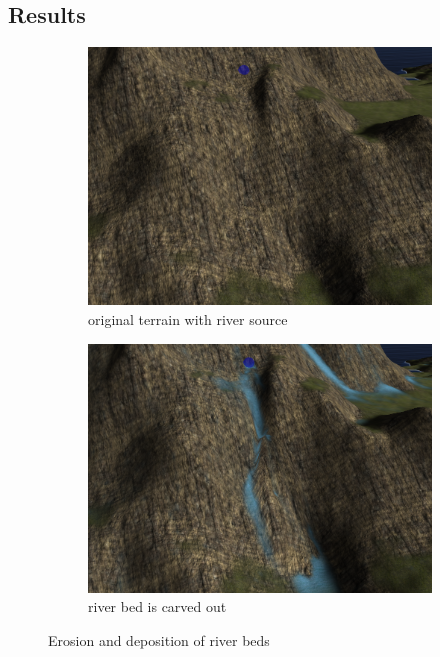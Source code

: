 \documentclass[journal, letterpaper]{IEEEtran}
\begin{document}
\subsection{Results}
\begin{figure}
	\centering
	\begin{subfigure}[b]{0.45\textwidth}
		\includegraphics[width=\textwidth]{images/River2}
		\caption{original terrain with river source}
		\label{fig:river1}
	\end{subfigure}
	\begin{subfigure}[b]{0.45\textwidth}
		\includegraphics[width=\textwidth]{images/River1}
		\caption{river bed is carved out}
		\label{fig:river2}
	\end{subfigure}
	\caption{Erosion and deposition of river beds}\label{fig:river}
\end{figure}
\end{document}

